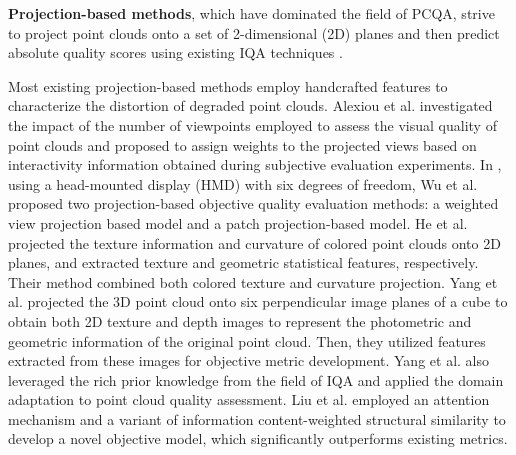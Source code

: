 \textbf{Projection-based methods}, which have dominated the field of PCQA, strive to project point clouds onto a set of 2-dimensional (2D) planes and then predict absolute quality scores using existing IQA techniques \citep{Zhangzc22, Alexioue19mex, wuxj21, Yangq21, Yang_2022_CVPR, liuq22, wang2024zoom}.

Most existing projection-based methods \citep{Zhangzc22} employ handcrafted features to characterize the distortion of degraded point clouds.
Alexiou et al. \citep{Alexioue19mex} investigated the impact of the number of viewpoints employed to assess the visual quality of point clouds and proposed to assign weights to the projected views based on interactivity information obtained during subjective evaluation experiments.
In \citep{wuxj21}, using a head-mounted display (HMD) with six degrees of freedom, Wu et al. proposed two projection-based objective quality evaluation methods: a weighted view projection based model and a patch projection-based model. 
He et al. \citep{Hezy21} projected the texture information and curvature of colored point clouds onto 2D planes, and extracted texture and geometric statistical features, respectively.
Their method combined both colored texture and curvature projection.
Yang et al.\citep{Yangq21} projected the 3D point cloud onto six perpendicular image planes of a cube to obtain both 2D texture and depth images to represent the photometric and geometric information of the original point cloud.
Then, they utilized features extracted from these images for objective metric development.
Yang et al. \citep{Yang_2022_CVPR} also leveraged the rich prior knowledge from the field of IQA and applied the domain adaptation to point cloud quality assessment.
Liu et al. \citep{liuq22} employed an attention mechanism and a variant of information content-weighted structural similarity to develop a novel objective model, which significantly outperforms existing metrics. 

